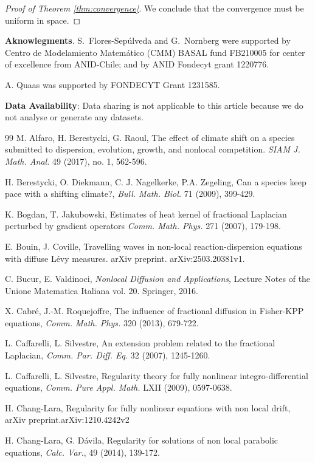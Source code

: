 \documentclass[11pt,a4paper]{amsart}
\begin{document}
\begin{proof}[Proof of Theorem \ref{thm:convergence}]
We conclude that the convergence must be uniform in space. 
\end{proof}
{\small

	{\bf Aknowlegments}. S.\ Flores-Sepúlveda and G.\ Nornberg were supported by Centro de Modelamiento Matemático (CMM) BASAL fund FB210005 for center of excellence from ANID-Chile; and by ANID Fondecyt grant 1220776.
	
	A. Quaas was supported by FONDECYT Grant 1231585.

	{\bf Data Availability}: Data sharing is not applicable to this article because we do not analyse or generate any datasets.
}
\begin{thebibliography}{99}
M. Alfaro, H. Berestycki, G. Raoul,
The effect of climate shift on a species submitted to dispersion, evolution, growth, and nonlocal competition.
{\it SIAM J. Math. Anal.} 49 (2017), no. 1, 562-596.

H. Berestycki, O. Diekmann, C. J. Nagelkerke, P.A. Zegeling,
Can a species keep pace with a shifting climate?,
{\it Bull. Math. Biol.} 71 (2009), 399-429.

K. Bogdan, T. Jakubowski,
Estimates of heat kernel of fractional Laplacian perturbed by gradient operators
{\it Comm. Math. Phys.} 271 (2007), 179-198.

E. Bouin, J. Coville,
Travelling waves in non-local reaction-dispersion equations with diffuse Lévy measures.
arXiv preprint. arXiv:2503.20381v1.

C. Bucur, E. Valdinoci,
{\it Nonlocal Diffusion and Applications},
Lecture Notes of the Unione Matematica Italiana vol. 20. Springer, 2016.

X. Cabré, J.-M. Roquejoffre,
The influence of fractional diffusion in Fisher-KPP equations,
{\it Comm. Math. Phys.} 320 (2013), 679-722.

L. Caffarelli, L. Silvestre,
An extension problem related to the fractional Laplacian,
{\it Comm. Par. Diff. Eq.} 32 (2007), 1245-1260.

L. Caffarelli, L. Silvestre,
Regularity theory for fully nonlinear integro-differential equations,
{\it Comm. Pure Appl. Math.} LXII (2009), 0597-0638.

H. Chang-Lara,
Regularity for fully nonlinear equations with non local drift,
arXiv preprint.arXiv:1210.4242v2

H. Chang-Lara, G. Dávila,
Regularity for solutions of non local parabolic equations,
{\it Calc. Var.}, 49 (2014), 139-172.


\end{thebibliography}
\end{document}
